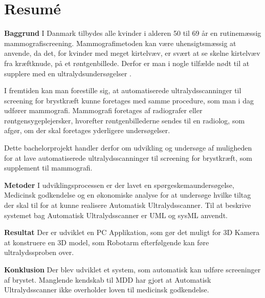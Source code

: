 \chapter{Resumé}
\textbf{Baggrund}
I Danmark tilbydes alle kvinder i alderen 50 til 69 år en rutinemæssig mammografiscreening. Mammografimetoden kan være uhensigtsmæssig at anvende, da det, for kvinder med meget kirtelvæv, er svært at se skelne kirtelvæv fra kræftknude, på et røntgenbillede. Derfor er man i nogle tilfælde nødt til at supplere med en ultralydsundersøgelser \cite{Ultralyd}.

I fremtiden kan man forestille sig, at automatiserede ultralydsscanninger til screening for brystkræft kunne foretages med samme procedure, som man i dag udfører mammografi. Mammografi foretages af radiografer eller røntgensygeplejersker, hvorefter røntgenbillederne sendes til en radiolog, som afgør, om der skal foretages yderligere undersøgelser.

Dette bachelorprojekt handler derfor om udvikling og undersøge af muligheden for at lave automatiserede ultralydsscanninger til screening for brystkræft, som supplement til mammografi.

\textbf{Metoder}
I udviklingsprocessen er der lavet en spørgeskemaundersøgelse, Medicinsk godkendelse og en økonomiske analyse for at undersøge hvilke tiltag der skal til for at kunne realisere Automatisk Ultralydsscanner. Til at beskrive systemet bag Automatisk Ultralydsscanner er UML og sysML anvendt. 

\textbf{Resultat}
Der er udviklet en PC Applikation, som gør det muligt for 3D Kamera at konstruere en 3D model, som Robotarm efterfølgende kan føre ultralydssproben over. 

\textbf{Konklusion}
Der blev udviklet et system, som automatisk kan udføre screeninger af brystet. Manglende kendskab til MDD har gjort at Automatisk Ultralydsscanner ikke overholder loven til medicinsk godkendelse. 